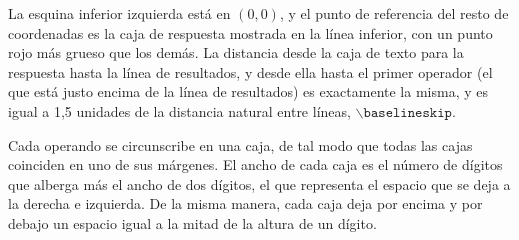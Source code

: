\documentclass[svgnames,addpoints]{exam}
\newlength{\zerowidth}
\newlength{\zeroheight}
\begin{document}
\begin{minipage}{0.20\linewidth}
\begin{center}
  \end{center}
\end{minipage}

La esquina inferior izquierda está en $(0, 0)$, y el punto de referencia del
resto de coordenadas es la caja de respuesta mostrada en la línea inferior,
con un punto rojo más grueso que los demás. La distancia desde la caja de
texto para la respuesta hasta la línea de resultados, y desde ella hasta el
primer operador (el que está justo encima de la línea de resultados) es
exactamente la misma, y es igual a 1,5 unidades de la distancia natural entre
líneas, $\backslash\mathtt{baselineskip}$.

Cada operando se circunscribe en una caja, de tal modo que todas las cajas
coinciden en uno de sus márgenes. El ancho de cada caja es el número de
dígitos que alberga más el ancho de dos dígitos, el que representa el espacio
que se deja a la derecha e izquierda. De la misma manera, cada caja deja por
encima y por debajo un espacio igual a la mitad de la altura de un dígito.
\end{document}
